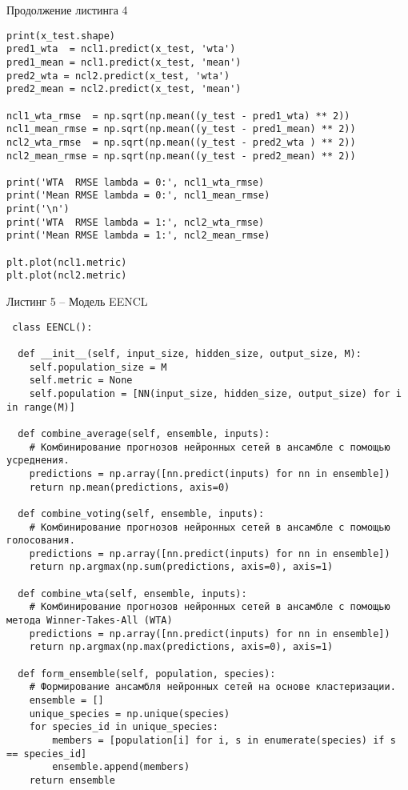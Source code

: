 \documentclass[12pt]{extarticle}
\begin{document}
\newpage

Продолжение листинга 4

\begin{lstlisting}
print(x_test.shape)
pred1_wta  = ncl1.predict(x_test, 'wta')
pred1_mean = ncl1.predict(x_test, 'mean')
pred2_wta = ncl2.predict(x_test, 'wta')
pred2_mean = ncl2.predict(x_test, 'mean')

ncl1_wta_rmse  = np.sqrt(np.mean((y_test - pred1_wta) ** 2))
ncl1_mean_rmse = np.sqrt(np.mean((y_test - pred1_mean) ** 2))
ncl2_wta_rmse  = np.sqrt(np.mean((y_test - pred2_wta ) ** 2))
ncl2_mean_rmse = np.sqrt(np.mean((y_test - pred2_mean) ** 2))

print('WTA  RMSE lambda = 0:', ncl1_wta_rmse)
print('Mean RMSE lambda = 0:', ncl1_mean_rmse)
print('\n')
print('WTA  RMSE lambda = 1:', ncl2_wta_rmse)
print('Mean RMSE lambda = 1:', ncl2_mean_rmse)

plt.plot(ncl1.metric)
plt.plot(ncl2.metric)
\end{lstlisting}

\newpage

Листинг 5 -- Модель EENCL

\begin{lstlisting}
 class EENCL():

  def __init__(self, input_size, hidden_size, output_size, M):
    self.population_size = M
    self.metric = None
    self.population = [NN(input_size, hidden_size, output_size) for i in range(M)]

  def combine_average(self, ensemble, inputs):
    # Комбинирование прогнозов нейронных сетей в ансамбле с помощью усреднения.
    predictions = np.array([nn.predict(inputs) for nn in ensemble])
    return np.mean(predictions, axis=0)

  def combine_voting(self, ensemble, inputs):
    # Комбинирование прогнозов нейронных сетей в ансамбле с помощью голосования.
    predictions = np.array([nn.predict(inputs) for nn in ensemble])
    return np.argmax(np.sum(predictions, axis=0), axis=1)

  def combine_wta(self, ensemble, inputs):
    # Комбинирование прогнозов нейронных сетей в ансамбле с помощью метода Winner-Takes-All (WTA)
    predictions = np.array([nn.predict(inputs) for nn in ensemble])
    return np.argmax(np.max(predictions, axis=0), axis=1)

  def form_ensemble(self, population, species):
    # Формирование ансамбля нейронных сетей на основе кластеризации.
    ensemble = []
    unique_species = np.unique(species)
    for species_id in unique_species:
        members = [population[i] for i, s in enumerate(species) if s == species_id]
        ensemble.append(members)
    return ensemble
\end{lstlisting}
\end{document}

